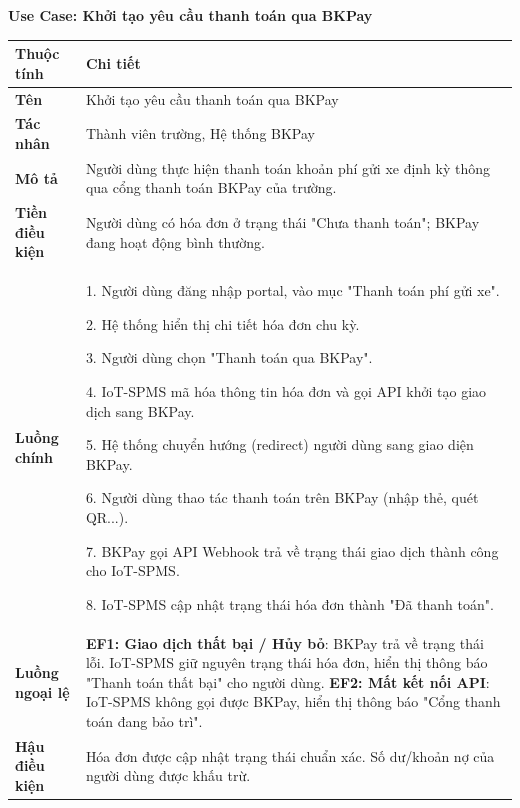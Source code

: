 \noindent \textbf{Use Case: Khởi tạo yêu cầu thanh toán qua BKPay} \\
\renewcommand{\arraystretch}{1.6}
\begin{xltabular}{\textwidth}{|l|X|}
\hline
\textbf{Thuộc tính} & \textbf{Chi tiết} \\
\hline
\textbf{Tên} & Khởi tạo yêu cầu thanh toán qua BKPay \\
\hline
\textbf{Tác nhân} & Thành viên trường, Hệ thống BKPay \\
\hline
\textbf{Mô tả} & Người dùng thực hiện thanh toán khoản phí gửi xe định kỳ thông qua cổng thanh toán BKPay của trường. \\
\hline
\textbf{Tiền điều kiện} & Người dùng có hóa đơn ở trạng thái "Chưa thanh toán"; BKPay đang hoạt động bình thường. \\
\hline
\textbf{Luồng chính} & 
1. Người dùng đăng nhập portal, vào mục "Thanh toán phí gửi xe".

2. Hệ thống hiển thị chi tiết hóa đơn chu kỳ.

3. Người dùng chọn "Thanh toán qua BKPay".

4. IoT-SPMS mã hóa thông tin hóa đơn và gọi API khởi tạo giao dịch sang BKPay.

5. Hệ thống chuyển hướng (redirect) người dùng sang giao diện BKPay.

6. Người dùng thao tác thanh toán trên BKPay (nhập thẻ, quét QR...).

7. BKPay gọi API Webhook trả về trạng thái giao dịch thành công cho IoT-SPMS.

8. IoT-SPMS cập nhật trạng thái hóa đơn thành "Đã thanh toán".
\\
\hline

\textbf{Luồng ngoại lệ} & 
\textbf{EF1: Giao dịch thất bại / Hủy bỏ}: BKPay trả về trạng thái lỗi. IoT-SPMS giữ nguyên trạng thái hóa đơn, hiển thị thông báo "Thanh toán thất bại" cho người dùng.\newline
\textbf{EF2: Mất kết nối API}: IoT-SPMS không gọi được BKPay, hiển thị thông báo "Cổng thanh toán đang bảo trì".
\\
\hline

\textbf{Hậu điều kiện} & Hóa đơn được cập nhật trạng thái chuẩn xác. Số dư/khoản nợ của người dùng được khấu trừ.\\
\hline
\end{xltabular}

